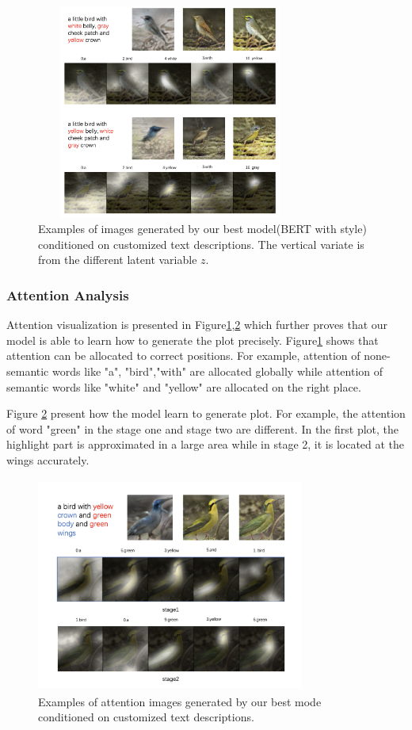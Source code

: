 \documentclass{article}
\begin{document}
\begin{figure}[htbp]

\centering
\includegraphics[width=250pt, height=200pt]{report/fig2.png} 
\caption{Examples of images generated by our best model(BERT with style) conditioned on
customized text descriptions. The vertical variate is from the different latent variable $z$.  }
\label{fig2}
\end{figure}


\subsubsection{Attention Analysis}

Attention visualization is presented in Figure\ref{fig2},\ref{fig3} which further proves that our model is able to learn how to generate the plot precisely.
Figure\ref{fig2} shows that attention can be allocated to correct positions. For example, attention of none-semantic words like "a", "bird","with" are allocated globally while attention of semantic words like "white" and "yellow" are allocated on the right place.

Figure \ref{fig3} present how the model learn to generate plot. For example, the attention of word "green" in the stage one and stage two are different. In the first plot, the highlight part is approximated in a large area while in stage 2, it is located at the wings accurately. 


\begin{figure}
\centering
\includegraphics[width=250pt, height=200pt]{report/fig3.png} 
\caption{Examples of attention images generated by our best mode conditioned on customized text descriptions.   }
\label{fig3}
\end{figure}
\end{document}
